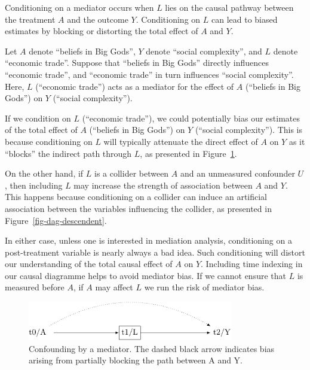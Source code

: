 \documentclass[
  singlecolumn]{report}
\begin{document}
Conditioning on a mediator occurs when \(L\) lies on the causal pathway
between the treatment \(A\) and the outcome \(Y\). Conditioning on \(L\)
can lead to biased estimates by blocking or distorting the total effect
of \(A\) and \(Y\).

Let \(A\) denote ``beliefs in Big Gods'', \(Y\) denote ``social
complexity'', and \(L\) denote ``economic trade''. Suppose that
``beliefs in Big Gods'' directly influences ``economic trade'', and
``economic trade'' in turn influences ``social complexity''. Here, \(L\)
(``economic trade'') acts as a mediator for the effect of \(A\)
(``beliefs in Big Gods'') on \(Y\) (``social complexity'').

If we condition on \(L\) (``economic trade''), we could potentially bias
our estimates of the total effect of \(A\) (``beliefs in Big Gods'') on
\(Y\) (``social complexity''). This is because conditioning on \(L\)
will typically attenuate the direct effect of \(A\) on \(Y\) as it
``blocks'' the indirect path through \(L\), as presented in
Figure~\ref{fig-dag-mediator}.

On the other hand, if \(L\) is a collider between \(A\) and an
unmeasured confounder \(U\), then including \(L\) may increase the
strength of association between \(A\) and \(Y\). This happens because
conditioning on a collider can induce an artificial association between
the variables influencing the collider, as presented in
Figure~\ref{fig-dag-descendent}.

In either case, unless one is interested in mediation analysis,
conditioning on a post-treatment variable is nearly always a bad idea.
Such conditioning will distort our understanding of the total causal
effect of \(A\) on \(Y\). Including time indexing in our causal
diagramme helps to avoid mediator bias. If we cannot ensure that \(L\)
is measured before \(A\), if \(A\) may affect \(L\) we run the risk of
mediator bias.

\begin{figure}

{\centering \includegraphics[width=0.8\textwidth,height=\textheight]{causal-dags_files/figure-pdf/fig-dag-mediator-1.pdf}

}

\caption{\label{fig-dag-mediator}Confounding by a mediator. The dashed
black arrow indicates bias arising from partially blocking the path
between A and Y.}

\end{figure}
\end{document}
